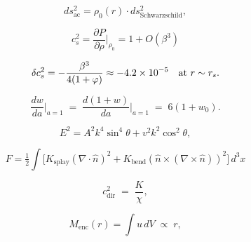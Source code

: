 \begin{equation}
  ds_{\mathrm{ac}}^2 = \rho_0(r)\cdot ds_{\mathrm{Schwarzschild}}^2,
  \label{P7:eq:acoustic_schwarz}
\end{equation}

\begin{equation}
  c_s^2 = \frac{\partial P}{\partial\rho}\bigg|_{\rho_0}
        = 1 + O(\beta^3)
  \label{P7:eq:cs_schwarz}
\end{equation}

\begin{equation}
  \delta c_s^2 = -\frac{\beta^3}{4(1+\varphi)} \approx -4.2\times10^{-5}
  \quad\text{at }r\sim r_s.
  \label{P7:eq:delta_cs}
\end{equation}

\begin{equation}
  \frac{dw}{da}\bigg|_{a=1}
  \;=\; \frac{d(1+w)}{da}\bigg|_{a=1}
  \;=\; 6(1+w_0).
  \label{P7:eq:dwa_slope}
\end{equation}

\begin{equation}
  E^2 = A^2 k^4\sin^4\!\theta + v^2 k^2\cos^2\!\theta,
  \label{P7:eq:semidirac}
\end{equation}

\begin{equation}
  F=\tfrac12\int\bigl[K_{\mathrm{splay}}(\nabla\!\cdot\hat{n})^2
    +K_{\mathrm{bend}}(\hat{n}\times(\nabla\times\hat{n}))^2\bigr]\,d^3x
  \label{P7:eq:frank}
\end{equation}

\begin{equation}
  c_{\mathrm{dir}}^2 \;=\; \frac{K}{\chi},
  \label{P7:eq:cdir}
\end{equation}

\begin{equation}
  M_{\mathrm{enc}}(r)=\int u\,dV \;\propto\; r,
  \label{P7:eq:Menc}
\end{equation}

